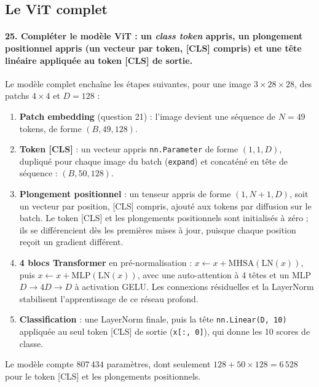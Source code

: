 \documentclass{report}
\begin{document}
\subsection{Le ViT complet}
\paragraph{25. Compléter le modèle ViT : un \textit{class token} appris, un plongement positionnel appris (un vecteur par token, [CLS] compris) et une tête linéaire appliquée au token [CLS] de sortie.}
Le modèle complet enchaîne les étapes suivantes, pour une image $3 \times 28 \times 28$, des patchs $4 \times 4$ et $D = 128$ :
\begin{enumerate}
    \item \textbf{Patch embedding} (question 21) : l'image devient une séquence de $N = 49$ tokens, de forme $(B, 49, 128)$.
    \item \textbf{Token [CLS]} : un vecteur appris \texttt{nn.Parameter} de forme $(1, 1, D)$, dupliqué pour chaque image du batch (\texttt{expand}) et concaténé en tête de séquence : $(B, 50, 128)$.
    \item \textbf{Plongement positionnel} : un tenseur appris de forme $(1, N + 1, D)$, soit un vecteur par position, [CLS] compris, ajouté aux tokens par diffusion sur le batch. Le token [CLS] et les plongements positionnels sont initialisés à zéro ; ils se différencient dès les premières mises à jour, puisque chaque position reçoit un gradient différent.
    \item \textbf{4 blocs Transformer} en pré-normalisation : $x \leftarrow x + \text{MHSA}(\text{LN}(x))$, puis $x \leftarrow x + \text{MLP}(\text{LN}(x))$, avec une auto-attention à 4 têtes et un MLP $D \to 4D \to D$ à activation GELU. Les connexions résiduelles et la LayerNorm stabilisent l'apprentissage de ce réseau profond.
    \item \textbf{Classification} : une LayerNorm finale, puis la tête \texttt{nn.Linear(D, 10)} appliquée au seul token [CLS] de sortie (\texttt{x[:, 0]}), qui donne les 10 scores de classe.
\end{enumerate}
Le modèle compte $807\,434$ paramètres, dont seulement $128 + 50 \times 128 = 6\,528$ pour le token [CLS] et les plongements positionnels.
\end{document}
